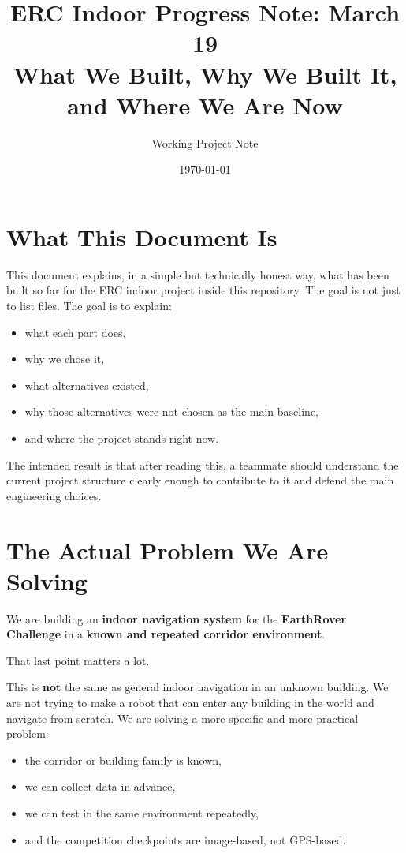 \documentclass[11pt,a4paper]{article}
\title{ERC Indoor Progress Note: March 19\\
\large What We Built, Why We Built It, and Where We Are Now}
\author{Working Project Note}
\date{\today}
\begin{document}
\maketitle

\section{What This Document Is}

This document explains, in a simple but technically honest way, what has been
built so far for the ERC indoor project inside this repository.  The goal is
not just to list files.  The goal is to explain:

\begin{itemize}[nosep]
  \item what each part does,
  \item why we chose it,
  \item what alternatives existed,
  \item why those alternatives were not chosen as the main baseline,
  \item and where the project stands right now.
\end{itemize}

The intended result is that after reading this, a teammate should understand the
current project structure clearly enough to contribute to it and defend the main
engineering choices.


\section{The Actual Problem We Are Solving}

We are building an \textbf{indoor navigation system} for the
\textbf{EarthRover Challenge} in a \textbf{known and repeated corridor
environment}.

That last point matters a lot.

This is \textbf{not} the same as general indoor navigation in an unknown
building.  We are not trying to make a robot that can enter any building in the
world and navigate from scratch.  We are solving a more specific and more
practical problem:

\begin{itemize}[nosep]
  \item the corridor or building family is known,
  \item we can collect data in advance,
  \item we can test in the same environment repeatedly,
  \item and the competition checkpoints are image-based, not GPS-based.
\end{itemize}
\end{document}
